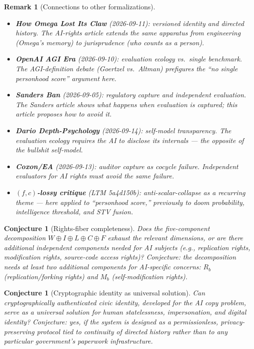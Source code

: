 \documentclass[11pt,a4paper]{article}
\newtheorem{conjecture}[definition]{Conjecture}
\newtheorem{remark}[definition]{Remark}
\begin{document}
\begin{remark}[Connections to other formalizations]
\begin{itemize}
\item \textbf{How Omega Lost Its Claw} (2026-09-11): versioned identity
  and directed history. The AI-rights article extends the same apparatus
  from engineering (Omega's memory) to jurisprudence (who counts as a
  person).
\item \textbf{OpenAI AGI Era} (2026-09-10): evaluation ecology vs.\ single
  benchmark. The AGI-definition debate (Goertzel vs.\ Altman) prefigures
  the ``no single personhood score'' argument here.
\item \textbf{Sanders Ban} (2026-09-05): regulatory capture and
  independent evaluation. The Sanders article shows what happens when
  evaluation is captured; this article proposes how to avoid it.
\item \textbf{Dario Depth-Psychology} (2026-09-14): self-model transparency.
  The evaluation ecology requires the AI to disclose its internals ---
  the opposite of the bullshit self-model.
\item \textbf{Coxon/EA} (2026-09-13): auditor capture as cocycle failure.
  Independent evaluators for AI rights must avoid the same failure.
\item \textbf{$(f,c)$-lossy critique} (LTM 5a4d150b): anti-scalar-collapse
  as a recurring theme --- here applied to ``personhood score,'' previously
  to doom probability, intelligence threshold, and STV fusion.
\end{itemize}
\end{remark}

\begin{conjecture}[Rights-fiber completeness]
Does the five-component decomposition $W \oplus I \oplus L \oplus C \oplus F$
exhaust the relevant dimensions, or are there additional independent
components needed for AI subjects (e.g., replication rights, modification
rights, source-code access rights)? Conjecture: the decomposition needs
at least two additional components for AI-specific concerns:
$R_b$ (replication/forking rights) and $M_b$ (self-modification rights).
\end{conjecture}

\begin{conjecture}[Cryptographic identity as universal solution]
Can cryptographically authenticated civic identity, developed for the AI
copy problem, serve as a universal solution for human statelessness,
impersonation, and digital identity? Conjecture: yes, if the system is
designed as a permissionless, privacy-preserving protocol tied to
continuity of directed history rather than to any particular government's
paperwork infrastructure.
\end{conjecture}
\end{document}
